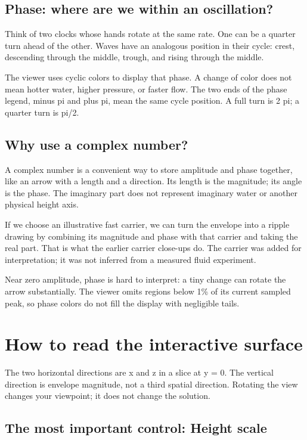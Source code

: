 \documentclass[10pt]{article}
\begin{document}
\subsection{Phase: where are we within an oscillation?}

Think of two clocks whose hands rotate at the same rate. One can be a quarter turn ahead of the other. Waves have an analogous position in their cycle: crest, descending through the middle, trough, and rising through the middle.

The viewer uses cyclic colors to display that phase. A change of color does not mean hotter water, higher pressure, or faster flow. The two ends of the phase legend, minus pi and plus pi, mean the same cycle position. A full turn is 2 pi; a quarter turn is pi/2.

\subsection{Why use a complex number?}

A complex number is a convenient way to store amplitude and phase together, like an arrow with a length and a direction. Its length is the magnitude; its angle is the phase. The imaginary part does not represent imaginary water or another physical height axis.

If we choose an illustrative fast carrier, we can turn the envelope into a ripple drawing by combining its magnitude and phase with that carrier and taking the real part. That is what the earlier carrier close-ups do. The carrier was added for interpretation; it was not inferred from a measured fluid experiment.

Near zero amplitude, phase is hard to interpret: a tiny change can rotate the arrow substantially. The viewer omits regions below 1\% of its current sampled peak, so phase colors do not fill the display with negligible tails.

\section{How to read the interactive surface}

The two horizontal directions are x and z in a slice at y = 0. The vertical direction is envelope magnitude, not a third spatial direction. Rotating the view changes your viewpoint; it does not change the solution.

\subsection{The most important control: Height scale}
\end{document}
